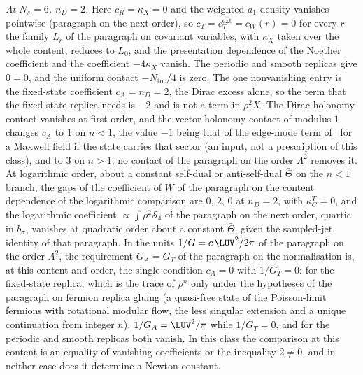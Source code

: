\emph{At \(N_s=6\), \(n_D=2\).} Here \(c_R=\kappa_X=0\) and the weighted \(a_1\) density vanishes pointwise (paragraph on the next order), so \(c_T=c_T^{\mathrm{ext}}=c_W(r)=0\) for every \(r\): the family \(L_r\) of the paragraph on covariant variables, with \(\kappa_X\) taken over the whole content, reduces to \(L_0\), and the presentation dependence of the Noether coefficient and the coefficient \(-4\kappa_X\) vanish. The periodic and smooth replicas give \(0=0\), and the uniform contact \(-N_{\mathrm{tot}}/4\) is zero. The one nonvanishing entry is the fixed-state coefficient \(c_A=n_D=2\), the Dirac excess alone, so the term that the fixed-state replica needs is \(-2\) and is not a term in \(\rho^2X\). The Dirac holonomy contact vanishes at first order, and the vector holonomy contact of modulus \(1\) changes \(c_A\) to \(1\) on \(n<1\), the value \(-1\) being that of the edge-mode term of~\cite{DonnellyWall2016} for a Maxwell field if the state carries that sector (an input, not a prescription of this class), and to \(3\) on \(n>1\); no contact of the paragraph on the order \(\Lambda^2\) removes it. At logarithmic order, about a constant self-dual or anti-self-dual \(\bar\Theta\) on the \(n<1\) branch, the gaps of the coefficient of \(W\) of the paragraph on the content dependence of the logarithmic comparison are \(0\), \(2\), \(0\) at \(n_D=2\), with \(\kappa_C^T=0\), and the logarithmic coefficient \(\propto\int\rho^2\mathcal S_4\) of the paragraph on the next order, quartic in \(b_\sigma\), vanishes at quadratic order about a constant \(\bar\Theta\), given the sampled-jet identity of that paragraph. In the units \(1/G=c\,\LUV^2/2\pi\) of the paragraph on the order \(\Lambda^2\), the requirement \(G_A=G_T\) of the paragraph on the normalisation is, at this content and order, the single condition \(c_A=0\) with \(1/G_T=0\): for the fixed-state replica, which is the trace of \(\rho^n\) only under the hypotheses of the paragraph on fermion replica gluing (a quasi-free state of the Poisson-limit fermions with rotational modular flow, the less singular extension and a unique continuation from integer \(n\)), \(1/G_A=\LUV^2/\pi\) while \(1/G_T=0\), and for the periodic and smooth replicas both vanish. In this class the comparison at this content is an equality of vanishing coefficients or the inequality \(2\neq0\), and in neither case does it determine a Newton constant.

